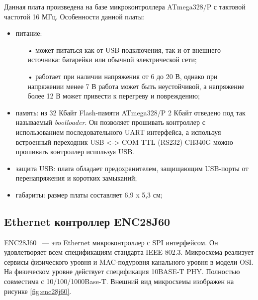 Данная плата произведена на базе микроконтроллера ATmega328/P с тактовой частотой 16 МГц. Особенности данной платы\cite{arduino}:
\begin{itemize}
	\item питание:
	\begin{itemize}
		\item[•] может питаться как от USB подключения, так и от внешнего источника: батарейки или обычной электрической сети;
		\item[•] работает при наличии напряжения от 6 до 20 В, однако при напряжении менее 7 В работа может быть неустойчивой, а напряжение более 12 В может привести к перегреву и повреждению;
	\end{itemize}
	\item память: из 32 Кбайт Flash-памяти ATmega328/P 2 Кбайт отведено под так называемый \textit{bootloader}. Он позволяет прошивать контроллер с использованием последовательного UART интерфейса, а используя встроенный переходник USB <-> COM TTL (RS232) CH340G можно прошивать контроллер используя USB.
	\item защита USB: плата обладает предохранителем, защищающим USB-порты от перенапряжения и коротких замыканий;
	\item габариты: размер платы составляет 6,9 x 5,3 см;
\end{itemize}

\subsection{Ethernet контроллер ENC28J60}

ENC28J60 ~--- это Ethernet микроконтроллер с SPI интерфейсом. Он удовлетворяет всем спецификациям стандарта IEEE 802.3. Микросхема реализует сервисы физического уровня и MAC-подуровня канального уровня в модели OSI. На физическом уровне действует спецификация 10BASE-T PHY. Полностью совместима с 10/100/1000Base-T. Внешний вид микросхемы изображен на рисунке \ref{fig:enc28j60}.


